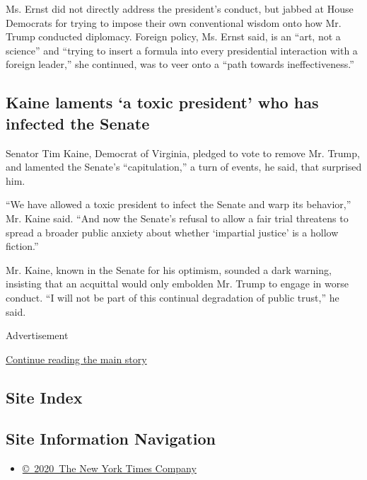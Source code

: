 Ms. Ernst did not directly address the president's conduct, but jabbed
at House Democrats for trying to impose their own conventional wisdom
onto how Mr. Trump conducted diplomacy. Foreign policy, Ms. Ernst said,
is an ``art, not a science'' and ``trying to insert a formula into every
presidential interaction with a foreign leader,'' she continued, was to
veer onto a ``path towards ineffectiveness.''

\hypertarget{kaine-laments-a-toxic-president-who-has-infected-the-senate}{%
\subsection{Kaine laments `a toxic president' who has infected the
Senate}\label{kaine-laments-a-toxic-president-who-has-infected-the-senate}}

Senator Tim Kaine, Democrat of Virginia, pledged to vote to remove Mr.
Trump, and lamented the Senate's ``capitulation,'' a turn of events, he
said, that surprised him.

``We have allowed a toxic president to infect the Senate and warp its
behavior,'' Mr. Kaine said. ``And now the Senate's refusal to allow a
fair trial threatens to spread a broader public anxiety about whether
`impartial justice' is a hollow fiction.''

Mr. Kaine, known in the Senate for his optimism, sounded a dark warning,
insisting that an acquittal would only embolden Mr. Trump to engage in
worse conduct. ``I will not be part of this continual degradation of
public trust,'' he said.

Advertisement

\protect\hyperlink{after-bottom}{Continue reading the main story}

\hypertarget{site-index}{%
\subsection{Site Index}\label{site-index}}

\hypertarget{site-information-navigation}{%
\subsection{Site Information
Navigation}\label{site-information-navigation}}

\begin{itemize}
\tightlist
\item
  \href{https://help.nytimes3xbfgragh.onion/hc/en-us/articles/115014792127-Copyright-notice}{©~2020~The
  New York Times Company}
\end{itemize}

